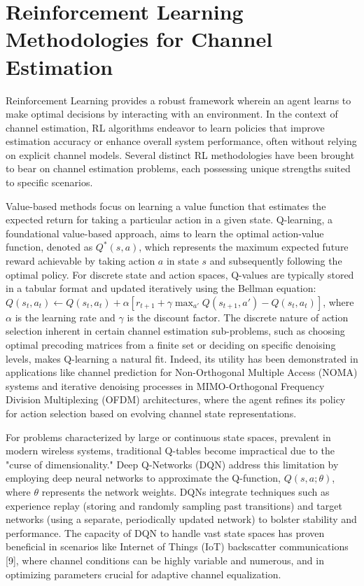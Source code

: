 \documentclass[journal,twocolumn]{IEEEtran}
\begin{document}
\section{Reinforcement Learning Methodologies for Channel Estimation}

Reinforcement Learning provides a robust framework wherein an agent learns to make optimal decisions by interacting with an environment. In the context of channel estimation, RL algorithms endeavor to learn policies that improve estimation accuracy or enhance overall system performance, often without relying on explicit channel models. Several distinct RL methodologies have been brought to bear on channel estimation problems, each possessing unique strengths suited to specific scenarios.

Value-based methods focus on learning a value function that estimates the expected return for taking a particular action in a given state. Q-learning, a foundational value-based approach, aims to learn the optimal action-value function, denoted as $Q^*(s, a)$, which represents the maximum expected future reward achievable by taking action $a$ in state $s$ and subsequently following the optimal policy. For discrete state and action spaces, Q-values are typically stored in a tabular format and updated iteratively using the Bellman equation: $Q(s_t, a_t) \leftarrow Q(s_t, a_t) + \alpha [r_{t+1} + \gamma \max_{a'} Q(s_{t+1}, a') - Q(s_t, a_t)]$, where $\alpha$ is the learning rate and $\gamma$ is the discount factor. The discrete nature of action selection inherent in certain channel estimation sub-problems, such as choosing optimal precoding matrices from a finite set or deciding on specific denoising levels, makes Q-learning a natural fit. Indeed, its utility has been demonstrated in applications like channel prediction for Non-Orthogonal Multiple Access (NOMA) systems and iterative denoising processes in MIMO-Orthogonal Frequency Division Multiplexing (OFDM) architectures, where the agent refines its policy for action selection based on evolving channel state representations.

For problems characterized by large or continuous state spaces, prevalent in modern wireless systems, traditional Q-tables become impractical due to the "curse of dimensionality." Deep Q-Networks (DQN) address this limitation by employing deep neural networks to approximate the Q-function, $Q(s, a; \theta)$, where $\theta$ represents the network weights. DQNs integrate techniques such as experience replay (storing and randomly sampling past transitions) and target networks (using a separate, periodically updated network) to bolster stability and performance. The capacity of DQN to handle vast state spaces has proven beneficial in scenarios like Internet of Things (IoT) backscatter communications [9], where channel conditions can be highly variable and numerous, and in optimizing parameters crucial for adaptive channel equalization.
\end{document}
